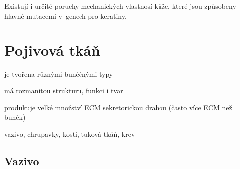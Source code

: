 \documentclass[DIV=8]{scrreprt}
\begin{document}
Existují i určité poruchy mechanických vlastnosí kůže, které jsou způsobeny hlavně mutacemi v genech pro keratiny.

\chapter{Pojivová tkáň} \label{Pojivová tkáň}


\begin{myItemize}[nosep]
    \item je tvořena různými buněčnými typy
    \item má rozmanitou strukturu, funkci i tvar
    \item produkuje velké množství ECM sekretorickou drahou (často více ECM než buněk)
    \item vazivo, chrupavky, kosti, tuková tkáň, krev
\end{myItemize}



\section{Vazivo} \label{Vazivo} \FloatBarrier
\end{document}
